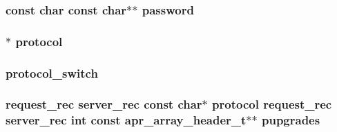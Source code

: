 \subsubsection[{\texorpdfstring{password}{password}}]{\setlength{\rightskip}{0pt plus 5cm}const char const char$\ast$$\ast$ password}\hypertarget{group__APACHE__CORE__PROTO_ga69b970a42043daa64861aba281a1e6f0}{}\label{group__APACHE__CORE__PROTO_ga69b970a42043daa64861aba281a1e6f0}
\subsubsection[{\texorpdfstring{protocol}{protocol}}]{ $\ast$ protocol}\hypertarget{group__APACHE__CORE__PROTO_gab4455c9ffced5cbd2748a0585c988a2f}{}\label{group__APACHE__CORE__PROTO_gab4455c9ffced5cbd2748a0585c988a2f}
\subsubsection[{\texorpdfstring{protocol\+\_\+switch}{protocol_switch}}]{\setlength{\rightskip}{0pt plus 5cm}protocol\+\_\+switch}\hypertarget{group__APACHE__CORE__PROTO_ga7d412a99ad93bc7e0cb671033448099d}{}\label{group__APACHE__CORE__PROTO_ga7d412a99ad93bc7e0cb671033448099d}
\subsubsection[{\texorpdfstring{pupgrades}{pupgrades}}]{ {\bf request\+\_\+rec} {\bf server\+\_\+rec} const char$\ast$ {\bf protocol} {\bf request\+\_\+rec} {\bf server\+\_\+rec} {\bf int} const {\bf apr\+\_\+array\+\_\+header\+\_\+t}$\ast$$\ast$ pupgrades}\hypertarget{group__APACHE__CORE__PROTO_ga587e44266cc9b55f474e6e3896f4a3eb}{}\label{group__APACHE__CORE__PROTO_ga587e44266cc9b55f474e6e3896f4a3eb}

